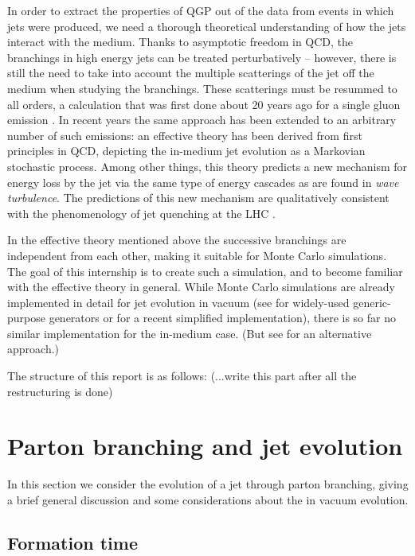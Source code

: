 \documentclass[a4paper,12pt]{article}
\numberwithin{equation}{section}
\begin{document}
In order to extract the properties of QGP out of the data from events in which jets were produced, we need a thorough theoretical understanding of how the jets interact with the medium. Thanks to asymptotic freedom in QCD, the branchings in high energy jets can be treated perturbatively -- however, there is still the need to take into account the multiple scatterings of the jet off the medium when studying the branchings. These scatterings must be resummed to all orders, a calculation that was first done about 20 years ago for a single gluon emission \cite{Baier:1996kr,Zakharov:1997uu}. In recent years the same approach has been extended to an arbitrary number of such emissions\cite{Blaizot:2012fh,Blaizot:2013hx}: an effective theory has been derived from first principles in QCD, depicting the in-medium jet evolution as a Markovian stochastic process. Among other things, this theory predicts a new mechanism for energy loss by the jet via the same type of energy cascades as are found in {\em wave turbulence}. The predictions of this new mechanism are qualitatively consistent with the phenomenology of jet
quenching at the LHC \cite{Aad:2010bu,Chatrchyan:2011sx}.

In the effective theory mentioned above the successive branchings are independent from each other, making it suitable for Monte Carlo simulations. The goal of this internship is to create such a simulation, and to become familiar with the effective theory in general. While Monte Carlo simulations are already implemented in detail for jet evolution in vacuum (see \cite{Pythia,Herwig} for widely-used generic-purpose generators or \cite{SmallR} for a recent simplified implementation), there is so far no similar implementation for the in-medium case. (But see \cite{Zapp:2012ak} for an alternative approach.) 




The structure of this report is as follows: (...write this part after all the restructuring is done)



\section{Parton branching and jet evolution}

In this section we consider the evolution of a jet through parton branching, giving a brief general discussion and some considerations about the in vacuum evolution.

\subsection{Formation time}
\end{document}
